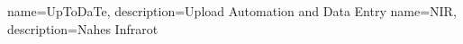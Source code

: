 {
  name=UpToDaTe,
  description={Upload Automation and Data Entry}
}
{
  name=NIR,
  description={Nahes Infrarot}
}

\renewcommand*{\glossaryname}{\section{\glossarName}}

\glsaddall
\printglossaries

